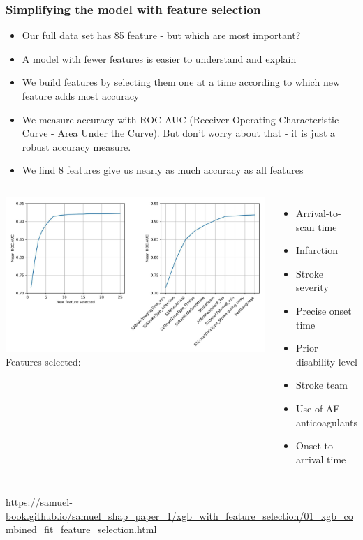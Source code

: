 \documentclass[xcolor={usenames,dvipsnames}]{beamer}
\newcommand{\smallurl}[1]{\textcolor{blue}{\fontsize{4pt}{4.8pt}\selectfont \url{#1}}}
\begin{document}
\begin{frame}
\frametitle{Simplifying the model with feature selection}

\begin{itemize}
    \tiny 
    \item Our full data set has 85 feature - but which are most important?
    \item A model with fewer features is easier to understand and explain
    \item We build features by selecting them one at a time according to which new feature adds most accuracy
    \item We measure accuracy with ROC-AUC (Receiver Operating Characteristic Curve - Area Under the Curve). But don’t worry about that - it is just a robust accuracy measure.
    \item We find 8 features give us nearly as much accuracy as all features
\end{itemize}

\vspace{0.5em}

\begin{columns}
    \includegraphics[width=1.0\textwidth]{./images/feature_selection_curves}
    \tiny
    Features selected:
    \begin{itemize}
        \tiny
        \item Arrival-to-scan time
        \item Infarction
        \item Stroke severity
        \item Precise onset time
        \item Prior disability level
        \item Stroke team
        \item Use of AF anticoagulants
        \item Onset-to-arrival time
    \end{itemize}
    \normalsize 
\end{columns}

\smallurl{https://samuel-book.github.io/samuel_shap_paper_1/xgb_with_feature_selection/01_xgb_combined_fit_feature_selection.html}

\end{frame}
\end{document}
